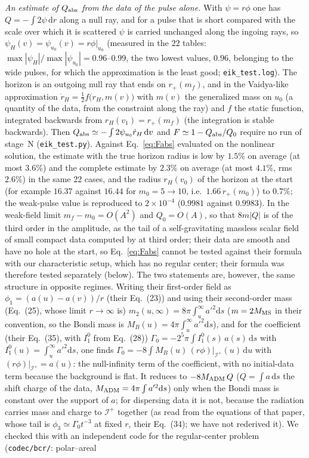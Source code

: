 \documentclass[11pt]{article}
\begin{document}
\emph{An estimate of $Q_{\rm abs}$ from the data of the pulse alone.} With $\psi=r\phi$ one has $Q=-\int2\psi\,\mathrm dr$ along a null ray, and for a pulse that is short compared with the scale over which it is scattered $\psi$ is carried unchanged along the ingoing rays, so $\psi_H(v)=\psi_{u_0}(v)=r\phi|_{u_0}$ (measured in the $22$ tables: $\max|\psi_H|/\max|\psi_{u_0}|=0.96$--$0.99$, the two lowest values, $0.96$, belonging to the wide pulses, for which the approximation is the least good; \texttt{eik\_test.log}). The horizon is an outgoing null ray that ends on $r_+(m_f)$, and in the Vaidya-like approximation $\dot r_H=\tfrac12f\bigl(r_H,m(v)\bigr)$ with $m(v)$ the generalized mass on $u_0$ (a quantity of the data, from the constraint along the ray) and $f$ the static function, integrated backwards from $r_H(v_1)=r_+(m_f)$ (the integration is stable backwards). Then $Q_{\rm abs}\simeq-\int2\psi_{u_0}\dot r_H\,\mathrm dv$ and $F\simeq1-Q_{\rm abs}/Q_0$ require no run of stage~N (\texttt{eik\_test.py}). Against Eq.~\eqref{eq:Fabs} evaluated on the nonlinear solution, the estimate with the true horizon radius is low by $1.5\%$ on average (at most $3.6\%$) and the complete estimate by $2.3\%$ on average (at most $4.1\%$, rms $2.6\%$) in the same $22$ cases, and the radius $r_H(v_0)$ of the horizon at the start (for example $16.37$ against $16.44$ for $m_0=5\to10$, i.e.\ $1.66\,r_+(m_0)$) to $0.7\%$; the weak-pulse value is reproduced to $2\times10^{-4}$ ($0.9981$ against $0.9983$). In the weak-field limit $m_f-m_0=O(A^{2})$ and $Q_0=O(A)$, so that $8m|Q|$ is of the third order in the amplitude, as the tail of a self-gravitating massless scalar field of small compact data computed by \citet{BizonChmajRostworowski2008} at third order; their data are smooth and have no hole at the start, so Eq.~\eqref{eq:Fabs} cannot be tested against their formula with our characteristic setup, which has no regular center; their formula was therefore tested separately (below). The two statements are, however, the same structure in opposite regimes. Writing their first-order field as $\phi_1=(a(u)-a(v))/r$ (their Eq.~(23)) and using their second-order mass (Eq.~(25), whose limit $r\to\infty$ is) $m_2(u,\infty)=8\pi\int_u^\infty a'^{2}\mathrm ds$ ($m=2M_{\rm MS}$ in their convention, so the Bondi mass is $M_B(u)=4\pi\int_u^\infty a'^{2}\mathrm ds$), and for the coefficient (their Eq.~(35), with $I_1^0$ from Eq.~(28)) $\Gamma_0=-2^{5}\pi\int I_1^0(s)\,a(s)\,\mathrm ds$ with $I_1^0(u)=\int_u^\infty a'^{2}\mathrm ds$, one finds $\Gamma_0=-8\int M_B(u)\,(r\phi)|_{\mathcal I^{+}}(u)\,\mathrm du$ with $(r\phi)|_{\mathcal I^{+}}=a(u)$: the null-infinity term of the \citet{GajicKehrberger2025} coefficient, with no initial-data term because the background is flat. It reduces to $-8M_{\rm ADM}\,Q$ ($Q=\int a\,\mathrm ds$ the shift charge of the data, $M_{\rm ADM}=4\pi\int a'^{2}\mathrm ds$) only when the Bondi mass is constant over the support of $a$; for dispersing data it is not, because the radiation carries mass and charge to $\mathcal I^{+}$ together (as read from the equations of that paper, whose tail is $\phi_3\simeq\Gamma_0t^{-3}$ at fixed $r$, their Eq.~(34); we have not rederived it). We checked this with an independent code for the regular-center problem (\texttt{codec/bcr/}: polar--areal 
\end{document}
